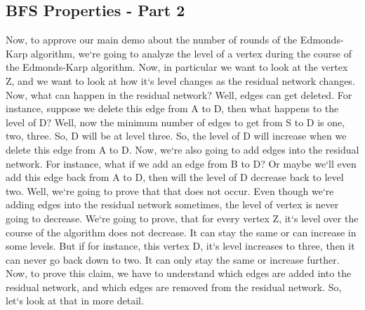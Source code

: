 \subsection{BFS Properties - Part 2}
Now, to approve our main demo about the number of rounds of the Edmonds-Karp algorithm, we`re going to analyze the level of a vertex during the course of the Edmonds-Karp algorithm.
Now, in particular we want to look at the vertex Z, and we want to look at how it`s level changes as the residual network changes.
Now, what can happen in the residual network? Well, edges can get deleted.
For instance, suppose we delete this edge from A to D, then what happens to the level of D? Well, now the minimum number of edges to get from S to D is one, two, three.
So, D will be at level three.
So, the level of D will increase when we delete this edge from A to D\@.
Now, we`re also going to add edges into the residual network.
For instance, what if we add an edge from B to D? Or maybe we`ll even add this edge back from A to D, then will the level of D decrease back to level two.
Well, we`re going to prove that that does not occur.
Even though we`re adding edges into the residual network sometimes, the level of vertex is never going to decrease.
We`re going to prove, that for every vertex Z, it`s level over the course of the algorithm does not decrease.
It can stay the same or can increase in some levels.
But if for instance, this vertex D, it`s level increases to three, then it can never go back down to two.
It can only stay the same or increase further.
Now, to prove this claim, we have to understand which edges are added into the residual network, and which edges are removed from the residual network.
So, let`s look at that in more detail.

